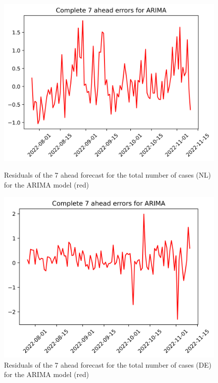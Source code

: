 \begin{figure}

\begin{minipage}{.45\textwidth}
  \centering
  \includegraphics[width=\linewidth]{pics/7_ah/7_ahead_errors_ARIMA.png}
  \caption{Residuals of the 7 ahead forecast for the total number of cases (NL) for the ARIMA model (red)}
  \label{fig:tot_cases_error_7_ARIMA}
\end{minipage}
\begin{minipage}{.45\textwidth}
  \centering
  \includegraphics[width=\linewidth]{pics/7_ah/DE_7_ahead_errors_ARIMA.png}
  \caption{Residuals of the 7 ahead forecast for the total number of cases (DE) for the ARIMA model (red)}
  \label{fig:tot_cases_error_7_ARIMA_DE}
\end{minipage}

\end{figure}
